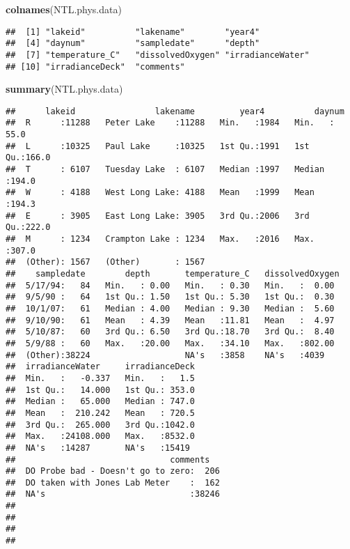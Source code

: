 \documentclass[]{article}
\newenvironment{Shaded}{\begin{snugshade}}{\end{snugshade}}
\newcommand{\KeywordTok}[1]{\textcolor[rgb]{0.13,0.29,0.53}{\textbf{#1}}}
\newcommand{\NormalTok}[1]{#1}
\begin{document}
\begin{Shaded}
\begin{Highlighting}[]
\KeywordTok{colnames}\NormalTok{(NTL.phys.data)}
\end{Highlighting}
\end{Shaded}

\begin{verbatim}
##  [1] "lakeid"          "lakename"        "year4"          
##  [4] "daynum"          "sampledate"      "depth"          
##  [7] "temperature_C"   "dissolvedOxygen" "irradianceWater"
## [10] "irradianceDeck"  "comments"
\end{verbatim}

\begin{Shaded}
\begin{Highlighting}[]
\KeywordTok{summary}\NormalTok{(NTL.phys.data)}
\end{Highlighting}
\end{Shaded}

\begin{verbatim}
##      lakeid                lakename         year4          daynum     
##  R      :11288   Peter Lake    :11288   Min.   :1984   Min.   : 55.0  
##  L      :10325   Paul Lake     :10325   1st Qu.:1991   1st Qu.:166.0  
##  T      : 6107   Tuesday Lake  : 6107   Median :1997   Median :194.0  
##  W      : 4188   West Long Lake: 4188   Mean   :1999   Mean   :194.3  
##  E      : 3905   East Long Lake: 3905   3rd Qu.:2006   3rd Qu.:222.0  
##  M      : 1234   Crampton Lake : 1234   Max.   :2016   Max.   :307.0  
##  (Other): 1567   (Other)       : 1567                                 
##    sampledate        depth       temperature_C   dissolvedOxygen 
##  5/17/94:   84   Min.   : 0.00   Min.   : 0.30   Min.   :  0.00  
##  9/5/90 :   64   1st Qu.: 1.50   1st Qu.: 5.30   1st Qu.:  0.30  
##  10/1/07:   61   Median : 4.00   Median : 9.30   Median :  5.60  
##  9/10/90:   61   Mean   : 4.39   Mean   :11.81   Mean   :  4.97  
##  5/10/87:   60   3rd Qu.: 6.50   3rd Qu.:18.70   3rd Qu.:  8.40  
##  5/9/88 :   60   Max.   :20.00   Max.   :34.10   Max.   :802.00  
##  (Other):38224                   NA's   :3858    NA's   :4039    
##  irradianceWater     irradianceDeck  
##  Min.   :   -0.337   Min.   :   1.5  
##  1st Qu.:   14.000   1st Qu.: 353.0  
##  Median :   65.000   Median : 747.0  
##  Mean   :  210.242   Mean   : 720.5  
##  3rd Qu.:  265.000   3rd Qu.:1042.0  
##  Max.   :24108.000   Max.   :8532.0  
##  NA's   :14287       NA's   :15419   
##                               comments    
##  DO Probe bad - Doesn't go to zero:  206  
##  DO taken with Jones Lab Meter    :  162  
##  NA's                             :38246  
##                                           
##                                           
##                                           
## 
\end{verbatim}
\end{document}
